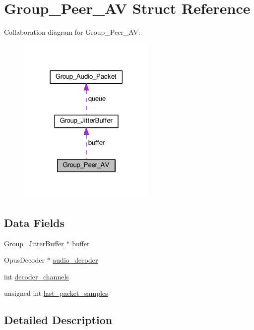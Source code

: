 \hypertarget{struct_group___peer___a_v}{\section{Group\+\_\+\+Peer\+\_\+\+A\+V Struct Reference}
\label{struct_group___peer___a_v}
}


Collaboration diagram for Group\+\_\+\+Peer\+\_\+\+A\+V\+:
\nopagebreak
\begin{figure}[H]
\begin{center}
\leavevmode
\includegraphics[width=189pt]{d2/df9/struct_group___peer___a_v__coll__graph}
\end{center}
\end{figure}
\subsection*{Data Fields}
\begin{DoxyCompactItemize}
\item 
\hyperlink{struct_group___jitter_buffer}{Group\+\_\+\+Jitter\+Buffer} $\ast$ \hyperlink{struct_group___peer___a_v_a6552b703c2e3958d1e030416f2893b27}{buffer}
\item 
Opus\+Decoder $\ast$ \hyperlink{struct_group___peer___a_v_a3b9ee5ac4c354a3e31a8acf7aa1a1b6c}{audio\+\_\+decoder}
\item 
int \hyperlink{struct_group___peer___a_v_afe1ef0788c8c4a05e136d1b00245138e}{decoder\+\_\+channels}
\item 
unsigned int \hyperlink{struct_group___peer___a_v_af679faefa170266e24bc2af9b5a0161e}{last\+\_\+packet\+\_\+samples}
\end{DoxyCompactItemize}


\subsection{Detailed Description}


